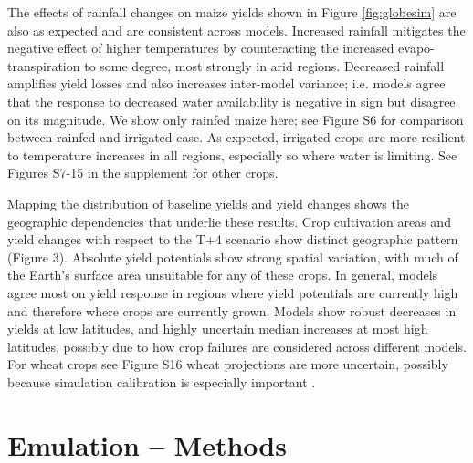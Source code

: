 \documentclass[gmd, manuscript]{copernicus} %
\begin{document}
The effects of rainfall changes on maize yields shown in Figure \ref{fig:globesim} are also as expected and are consistent across models. Increased rainfall mitigates the negative effect of higher temperatures by counteracting the increased evapo-transpiration to some degree, most strongly in arid regions.
Decreased rainfall amplifies yield losses and also increases inter-model variance; i.e. models agree that the response to decreased water availability is negative in sign but disagree on its magnitude.
We show only rainfed maize here; see Figure S6 for comparison between rainfed and irrigated case. As expected, irrigated crops are more resilient to temperature increases in all regions, especially so where water is limiting. See Figures S7-15 in the supplement for other crops.   

Mapping the distribution of baseline yields and yield changes shows the geographic dependencies that underlie these results. Crop cultivation areas and yield changes with respect to the T+4 scenario show distinct geographic pattern (Figure 3). Absolute yield potentials show strong spatial variation, with much of the Earth's surface area unsuitable for any of these crops. In general, models agree most on yield response in regions where yield potentials are currently high and therefore where crops are currently grown. Models show robust decreases in yields at low latitudes, and highly uncertain median increases at most high latitudes, possibly due to how crop failures are considered across different models. For wheat crops see Figure S16 wheat projections are more uncertain, possibly because simulation calibration is especially important \citep[e.g.][]{Asseng2013}.

\section{Emulation -- Methods}
\label{S:4}
\end{document}
